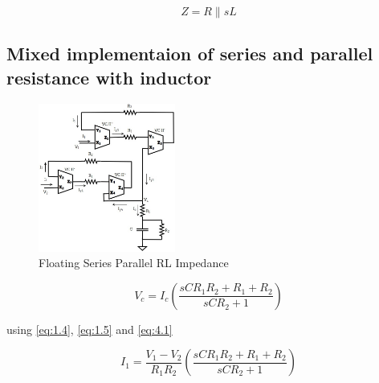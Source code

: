 \documentclass{./styles/svproc}
\begin{document}
\begin{equation}\label{eq:3.4}
{Z} = {R}\parallel{sL}
\end{equation}




\subsection{Mixed implementaion of series and parallel resistance with inductor}
\begin{figure}[h]
\begin{center}
    \includegraphics[width=0.4\textwidth]{advanced.jpg}
    \caption{Floating Series Parallel RL Impedance}
  \end{center}
\end{figure}

\begin{equation}\label{eq:4.1}
V_c=I_c \left( \frac{sCR_1R_2+R_1+R_2}{sCR_2 +1} \right)
\end{equation}

using \eqref{eq:1.4}, \eqref{eq:1.5} and \eqref{eq:4.1}

\begin{equation}\label{eq:4.2}
I_1=\frac{V_1-V_2}{R_1R_2} \left( \frac{sCR_1R_2+R_1+R_2}{sCR_2 +1} \right)
\end{equation}
\end{document}
